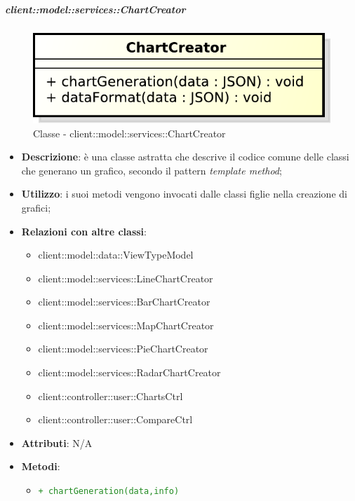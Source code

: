 		\subparagraph{client::model::services::ChartCreator} %
		\label{subp:chartcreator}
			\begin{figure}[htbp]
				\centering
				\centerline{\includegraphics[scale=0.7]{./images/client/classes/model/chart_creator.pdf}}
				\caption{Classe - client::model::services::ChartCreator}
			\end{figure}
			\begin{itemize}
				\item \textbf{Descrizione}: è una classe astratta che descrive il codice comune delle classi che generano un grafico, secondo il pattern \emph{template method};
				\item \textbf{Utilizzo}: i suoi metodi vengono invocati dalle classi figlie nella creazione di grafici;
				\item \textbf{Relazioni con altre classi}:
					\begin{itemize}
						\item client::model::data::ViewTypeModel
						\item client::model::services::LineChartCreator
						\item client::model::services::BarChartCreator
						\item client::model::services::MapChartCreator
						\item client::model::services::PieChartCreator
						\item client::model::services::RadarChartCreator
						\item client::controller::user::ChartsCtrl
						\item client::controller::user::CompareCtrl
					\end{itemize}
				\item \textbf{Attributi}: N/A
				\item \textbf{Metodi}: 
					\begin{itemize}
						\item \textcolor{forestgreen}{\texttt{+ chartGeneration(data,info)}}
\end{itemize}
\end{itemize}
